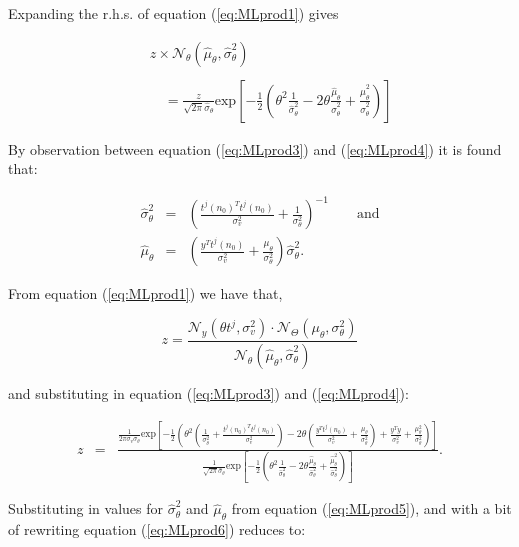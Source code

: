 Expanding the r.h.s. of equation (\ref{eq:MLprod1}) gives

\begin{eqnarray}\label{eq:MLprod4}
& & z \times \mathcal{N}_\theta(\hat{\mu}_\theta,\hat{\sigma}^2_\theta) \\\nonumber{}\\\nonumber
& & \quad = \frac{z}{\sqrt{2 \pi}\hat{\sigma}_\theta}\textrm{exp}\left[-\frac{1}{2}\left(\theta^2\frac{1}{\hat{\sigma}^2_\theta} - 2\theta\frac{\hat{\mu}_\theta}{\hat{\sigma}^2_\theta} + \frac{\hat{\mu}_\theta^2}{\hat{\sigma}^2_\theta}  \right)\right]
\end{eqnarray}

By observation between equation (\ref{eq:MLprod3}) and (\ref{eq:MLprod4}) it is found that:

\begin{eqnarray}
\label{eq:MLprod5}
\hat{\sigma}^2_\theta &=& \left(\frac{t^j(n_0)^T t^j(n_0)}{\sigma_v^2} + \frac{1}{\sigma_\theta^2}\right)^{-1} \qquad \textrm{and}\\\nonumber
\hat{\mu}_\theta &=& \left(\frac{y^T t^j(n_0)}{\sigma_v^2} + \frac{\mu_\theta}{\sigma^2_\theta}\right)\hat{\sigma}^2_\theta.
\end{eqnarray}

From equation (\ref{eq:MLprod1}) we have that,

\begin{equation}\label{eq:MLprod2}
z = \frac{\mathcal{N}_y(\theta t^j,\sigma_v^2)\cdot\mathcal{N}_\Theta(\mu_\theta,\sigma^2_\theta)}{\mathcal{N}_\theta(\hat{\mu}_\theta,\hat{\sigma}^2_\theta)}
\end{equation}

and substituting in equation (\ref{eq:MLprod3}) and (\ref{eq:MLprod4}):

\begin{eqnarray}\label{eq:MLprod6}
z &=& \frac{\frac{1}{2\pi \sigma_v \sigma_\theta} \textrm{exp}\left[-\frac{1}{2}\left(\theta^2 \left(\frac{1}{\sigma_\theta^2}+\frac{t^j(n_0)^T t^j(n_0)}{\sigma_v^2}\right) - 2\theta\left(\frac{y^T t^j(n_0)}{\sigma_v^2}+\frac{\mu_\theta}{\sigma_\theta^2}\right) + \frac{y^T y}{\sigma_v^2} +\frac{\mu_\theta^2}{\sigma_\theta^2}\right)\right]}{\frac{1}{\sqrt{2 \pi}\hat{\sigma}_\theta}\textrm{exp}\left[-\frac{1}{2}\left(\theta^2\frac{1}{\hat{\sigma}^2_\theta} - 2\theta\frac{\hat{\mu}_\theta}{\hat{\sigma}^2_\theta} + \frac{\hat{\mu}_\theta^2}{\hat{\sigma}^2_\theta}  \right)\right]}.
\end{eqnarray}

Substituting in values for $\hat{\sigma}^2_\theta$ and $\hat{\mu}_\theta$ from equation (\ref{eq:MLprod5}), and with a bit of rewriting equation (\ref{eq:MLprod6}) reduces to:

